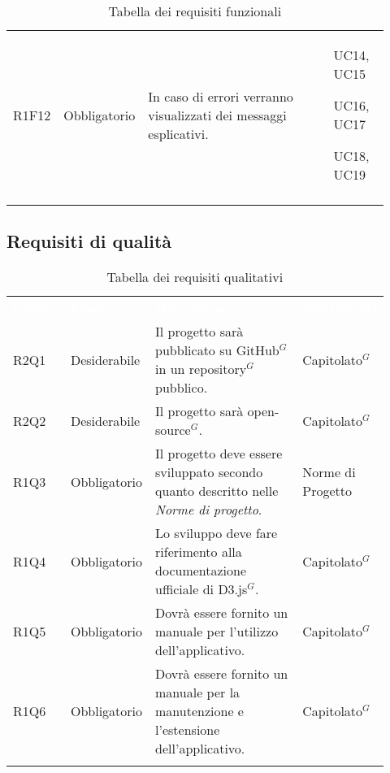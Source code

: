 {\begin{longtable}{p{0.12\linewidth}p{0.15\linewidth}p{0.50\linewidth}p{0.15\linewidth}}
    \rowcolor[RGB]{233, 245, 206}
    R1F12 & Obbligatorio & In caso di errori verranno visualizzati dei messaggi esplicativi. & UC14, UC15 \par UC16, UC17 \par UC18, UC19\\

    \caption{Tabella dei requisiti funzionali}

\end{longtable}
}


\subsection{Requisiti di qualità}
{\renewcommand{\arraystretch}{1.5}
\begin{longtable}{p{0.12\linewidth}p{0.15\linewidth}p{0.50\linewidth}p{0.15\linewidth}}
	\rowcolor[RGB]{33, 73, 50}
	\textcolor{white}{\textbf{Codice}} & \textcolor{white}{\textbf{Classe}} & \textcolor{white}{\textbf{Descrizione}} &
    \textcolor{white}{\textbf{Riferimenti}}\\

    \rowcolor[RGB]{216, 235, 171}
    R2Q1 & Desiderabile & Il progetto sarà pubblicato su GitHub$^{G}$ in un repository$^{G}$ pubblico. & Capitolato$^{G}$\\
    \rowcolor[RGB]{233, 245, 206}
    R2Q2 & Desiderabile & Il progetto sarà open-source$^{G}$. & Capitolato$^{G}$\\
    \rowcolor[RGB]{216, 235, 171}
    R1Q3 & Obbligatorio & Il progetto deve essere sviluppato secondo quanto descritto nelle \textit{Norme di progetto}. & Norme di Progetto\\
    \rowcolor[RGB]{233, 245, 206}
    R1Q4 & Obbligatorio & Lo sviluppo deve fare riferimento alla documentazione ufficiale di D3.js$^{G}$. & Capitolato$^{G}$\\
    \rowcolor[RGB]{216, 235, 171}
    R1Q5 & Obbligatorio & Dovrà essere fornito un manuale per l'utilizzo dell'applicativo. & Capitolato$^{G}$\\
    \rowcolor[RGB]{233, 245, 206}
    R1Q6 & Obbligatorio & Dovrà essere fornito un manuale per la manutenzione e l'estensione dell'applicativo. & Capitolato$^{G}$\\

    \caption{Tabella dei requisiti qualitativi}
\end{longtable}
}

